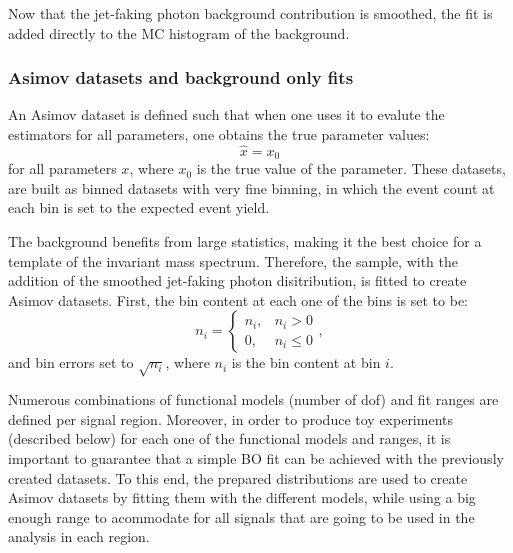 Now that the jet-faking photon background contribution is smoothed, the fit is added directly to the \ac{MC} histogram of the \gammajet background.





\subsubsection{Asimov datasets and background only fits}
\label{subsubsec:bkg:modeling:preparation:asimov_bkgonly}

An Asimov dataset is defined such that when one uses it to evalute the estimators for all parameters, one obtains the true parameter values:
\begin{equation}
    \hat{x} = x_0
\end{equation}
for all parameters \(x\), where \(x_0\) is the true value of the parameter. These datasets, are built as binned datasets with very fine binning, in which the event count at each bin is set to the expected event yield.

The \pythia \gammajet background benefits from large statistics, making it the best choice for a template of the \gammajet invariant mass spectrum. Therefore, the \pythia \gammajet sample, with the addition of the smoothed jet-faking photon disitribution, is fitted to create Asimov datasets. First, the bin content at each one of the bins is set to be:
\begin{equation}
    n_i = 
    \begin{cases}
        n_i, & n_i > 0\\
        0, & n_i \leq 0
    \end{cases},
\end{equation}
and bin errors set to \(\sqrt{n_i}\), where \(n_i\) is the bin content at bin \(i\).


Numerous combinations of functional models (number of \ac{dof}) and fit ranges are defined per signal region. Moreover, in order to produce toy experiments (described below) for each one of the functional models and ranges, it is important to guarantee that a simple \ac{BO} fit can be achieved with the previously created datasets.
To this end, the prepared \myj distributions are used to create Asimov datasets by fitting them with the different models, while using a big enough range to acommodate for all signals that are going to be used in the analysis in each region.

